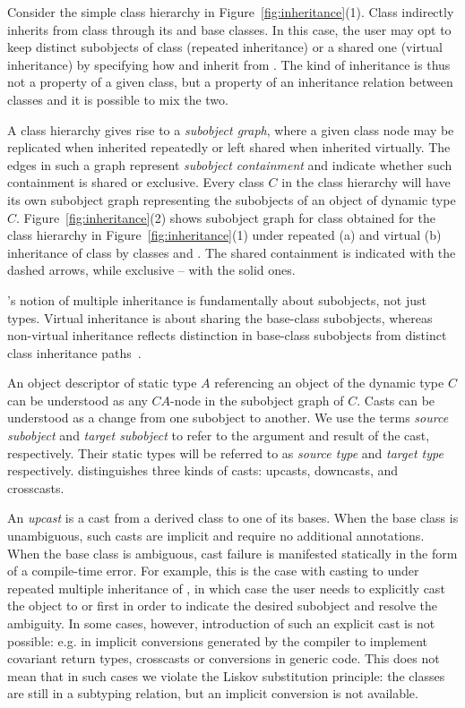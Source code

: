 \noindent
Consider the simple class hierarchy in Figure~\ref{fig:inheritance}(1). Class 
 indirectly inherits from class  through its  and 
 base classes. In this case, the user may opt to keep distinct 
subobjects of class  (repeated inheritance) or a shared one (virtual 
inheritance) by specifying how  and  inherit from 
. The kind of inheritance is thus not a property of a given class, but a 
property of an inheritance relation between classes and it is possible to mix the two. 

A class hierarchy gives rise to a \emph{subobject graph}, where a given class 
node may be replicated when inherited repeatedly or left shared when inherited 
virtually. The edges in such a graph represent \emph{subobject containment} and 
indicate whether such containment is shared or exclusive. 
Every class $C$ in the class hierarchy will have its own subobject 
graph representing the subobjects of an object of dynamic type $C$.
Figure~\ref{fig:inheritance}(2) shows subobject graph for class  
obtained for the class hierarchy in Figure~\ref{fig:inheritance}(1) under repeated (a) and virtual (b) 
inheritance of class  by classes  and . The shared 
containment is indicated with the dashed arrows, while exclusive -- with the solid 
ones.

\Cpp{}'s notion of multiple inheritance is fundamentally about 
subobjects, not just types.  Virtual inheritance is about
sharing the base-class subobjects, whereas non-virtual inheritance
reflects distinction in base-class subobjects from distinct class inheritance paths~\cite{CPPARM90}.

An object descriptor of static type $A$ referencing an object of the dynamic 
type $C$ can be understood as any $C$\code{::*::}$A$-node in the subobject graph of $C$. 
Casts can be understood as a change from one subobject to another.
We use the terms \emph{source subobject} and \emph{target 
subobject} to refer to the argument and result of the cast, respectively. Their 
static types will be referred to as \emph{source type} and \emph{target type} 
respectively. \Cpp{} distinguishes three kinds of casts: upcasts, downcasts, and 
crosscasts.

An \emph{upcast} is a cast from a derived class to one of its bases. When the 
base class is unambiguous, such casts are implicit and require no additional 
annotations. When the base class is ambiguous, cast failure is manifested 
statically in the form of a compile-time error. For example, this is the case with 
casting  to  under repeated multiple inheritance of , 
in which case the user needs to explicitly cast the object to  or 
 first in order to indicate the desired subobject and resolve the ambiguity. 
In some cases, however, introduction of such an explicit cast is not possible: 
e.g. in implicit conversions generated by the compiler to implement covariant 
return types, crosscasts or conversions in generic code. This does not mean 
that in such cases we violate the Liskov substitution principle: the 
classes are still in a subtyping relation, but an implicit conversion is not 
available.

